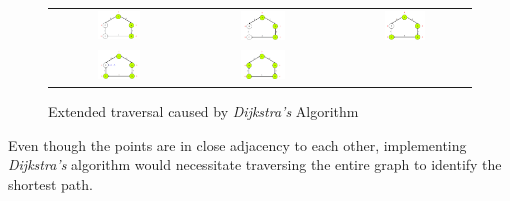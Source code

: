 \documentclass[12pt, a4paper]{article}
\begin{document}
\begin{figure}[h]
\begin{tabular}{ccc}
   

        \includegraphics[width=0.33\textwidth]{Images/7.png} & 
        \includegraphics[width=0.33\textwidth]{Images/8.png} &
        \includegraphics[width=0.33\textwidth]{Images/9.png} \\

    

        \includegraphics[width=0.33\textwidth]{Images/10.png} & 
        \includegraphics[width=0.33\textwidth]{Images/11.png} &
         \\
    \end{tabular}
    \caption{Extended traversal caused by \textit{Dijkstra's} Algorithm}
    \label{fig:my_label}
\end{figure}

\par Even though the points are in close adjacency to each other, implementing \textit{Dijkstra's} algorithm would necessitate traversing the entire graph to identify the shortest path.
\end{document}
